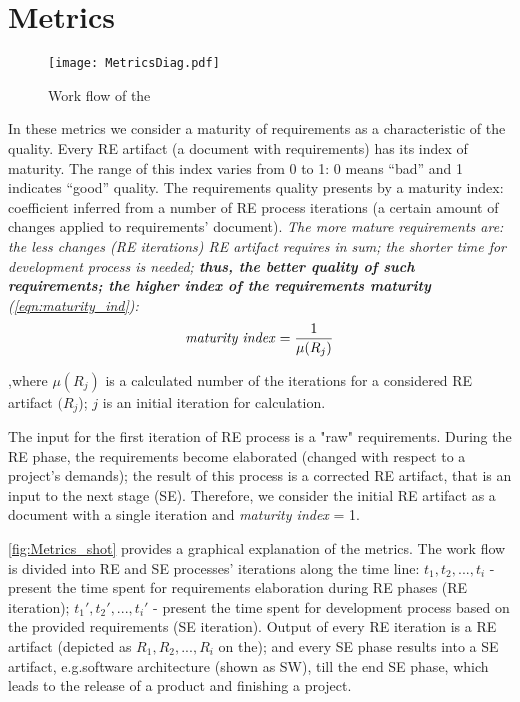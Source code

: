 \section{Metrics}
\label{sec:Solution} 

\begin{figure*}[!th]
	\centering
		\texttt{[image: MetricsDiag.pdf]}
	\caption{Work flow of the }
	\label{fig:Metrics_shot}
\end{figure*}

In these metrics we consider a maturity of requirements as a characteristic of the quality.
Every RE artifact (a document with requirements) has its index of maturity. The range of this index varies from 0 to 1: 0 means ``bad'' and 1 indicates ``good'' quality.
The requirements quality presents by a maturity index: coefficient inferred from a number of RE process iterations (a certain amount of changes applied to requirements' document).
\textit{The more mature requirements are: the less changes (RE iterations) RE artifact requires in sum; the shorter time for development process is needed; \textbf{thus, the better quality of such requirements; the higher index of the requirements maturity }(\autoref{eqn:maturity_ind}):}
  \begin{equation}\label{eqn:maturity_ind}
\textrm{\textit{maturity index}} = \frac{1}{\mu(R_{j})}
	\end{equation}

,where $\mu(R_{j})$ is a calculated number of the iterations for a considered RE artifact $(R_{j}$); $j$ is an initial iteration for calculation.

The input for the first iteration of RE process is a "raw" requirements. During the RE phase, the requirements become elaborated (changed with respect to a project's demands); the result of this process is a corrected RE artifact, that is an input to the next stage (SE). Therefore, we consider the initial RE artifact as a document with a single iteration and \textit{maturity index} = 1.

\autoref{fig:Metrics_shot} provides a graphical explanation of the metrics. The work flow is divided into RE and SE processes' iterations along the time line: $t_{1},t_{2},...,t_{i}$ - present the time spent for requirements elaboration during RE phases (RE iteration); $t_{1}',t_{2}',...,t_{i}'$ - present the time spent for development process based on the provided requirements (SE iteration).
Output of every RE iteration is a RE artifact (depicted as $R_{1},R_{2},...,R_{i}$ on the); and every SE phase results into a SE artifact, e.g.software architecture (shown as SW), till the end SE phase, which leads to the release of a product and finishing a project.  

